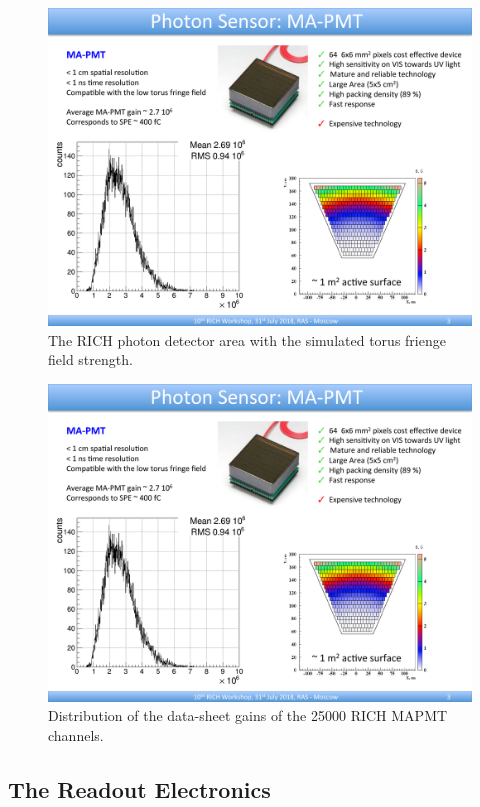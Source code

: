 \documentclass[final,5p,times,twocolumn]{elsarticle}
\begin{document}
\begin{figure}[t]
\begin{center}
\includegraphics[width=0.65\columnwidth]{EPS/Field.pdf}
\end{center}
\caption{The RICH photon detector area with the simulated torus frienge field strength.}
\label{fig:MagFringe}
\end{figure}

\begin{figure}[t]
\begin{center}
\includegraphics[width=0.65\columnwidth]{EPS/Gain.pdf}
\end{center}
\caption{Distribution of the data-sheet gains of the 25000 RICH MAPMT channels.}
\label{fig:MAPMTGain}
\end{figure}

\subsection{The Readout Electronics}
\end{document}
